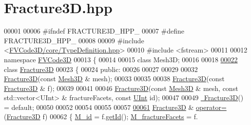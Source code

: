 \hypertarget{Fracture3D_8hpp_source}{}\section{Fracture3\+D.\+hpp}
\label{Fracture3D_8hpp_source}

\begin{DoxyCode}
00001 
00006 \textcolor{preprocessor}{#ifndef FRACTURE3D\_HPP\_}
00007 \textcolor{preprocessor}{#define FRACTURE3D\_HPP\_}
00008 
00009 \textcolor{preprocessor}{#include <\hyperlink{TypeDefinition_8hpp}{FVCode3D/core/TypeDefinition.hpp}>}
00010 \textcolor{preprocessor}{#include <fstream>}
00011 
00012 \textcolor{keyword}{namespace }\hyperlink{namespaceFVCode3D}{FVCode3D}
00013 \{
00014 
00015 \textcolor{keyword}{class }Mesh3D;
00016 
00018 
\hypertarget{Fracture3D_8hpp_source.tex_l00022}{}\hyperlink{classFVCode3D_1_1Fracture3D}{00022} \textcolor{keyword}{class }\hyperlink{classFVCode3D_1_1Fracture3D}{Fracture3D}
00023 \{
00024 \textcolor{keyword}{public}:
00026 
00027 
00029 
00032     \hyperlink{classFVCode3D_1_1Fracture3D_a71eac02a97fa86896ae0a779fa581d03}{Fracture3D}(\textcolor{keyword}{const} \hyperlink{classFVCode3D_1_1Mesh3D}{Mesh3D} & mesh);
00033 
00035 
00038     \hyperlink{classFVCode3D_1_1Fracture3D_a71eac02a97fa86896ae0a779fa581d03}{Fracture3D}(\textcolor{keyword}{const} \hyperlink{classFVCode3D_1_1Fracture3D}{Fracture3D} & f);
00039 
00041 
00046     \hyperlink{classFVCode3D_1_1Fracture3D_a71eac02a97fa86896ae0a779fa581d03}{Fracture3D}(\textcolor{keyword}{const} \hyperlink{classFVCode3D_1_1Mesh3D}{Mesh3D} & mesh, \textcolor{keyword}{const} std::vector<UInt> & fractureFacets, \textcolor{keyword}{const} 
      \hyperlink{namespaceFVCode3D_a4bf7e328c75d0fd504050d040ebe9eda}{UInt} \textcolor{keywordtype}{id});
00047 
00049     \hyperlink{classFVCode3D_1_1Fracture3D_ab485e2197b87c25de7f8d42db04a3b95}{~Fracture3D}() = \textcolor{keywordflow}{default};
00050 
00052 
00054 
00055 
00057 
\hypertarget{Fracture3D_8hpp_source.tex_l00061}{}\hyperlink{classFVCode3D_1_1Fracture3D_ab3dae8603c747c67b0483e01b863a89e}{00061}     \hyperlink{classFVCode3D_1_1Fracture3D}{Fracture3D} & \hyperlink{classFVCode3D_1_1Fracture3D_ab3dae8603c747c67b0483e01b863a89e}{operator=}(\hyperlink{classFVCode3D_1_1Fracture3D}{Fracture3D} f)
00062         \{ \hyperlink{classFVCode3D_1_1Fracture3D_a38b5200e499e51977db8f816a95eccd9}{M\_id} = f.\hyperlink{classFVCode3D_1_1Fracture3D_acf744c39ce0958b84a2ce9c09d314ec4}{getId}(); \hyperlink{classFVCode3D_1_1Fracture3D_ab2da921dc007666c4f9111b3204f0072}{M\_fractureFacets} = f.

\end{DoxyCode}
